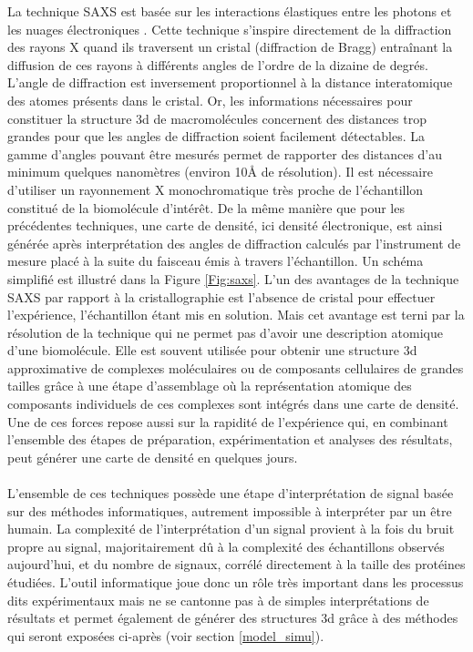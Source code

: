 La technique SAXS est basée sur les interactions élastiques entre les photons et les nuages électroniques \cite{guimer1955small}. Cette technique s'inspire directement de la diffraction des rayons X quand ils traversent un cristal (diffraction de Bragg) entraînant la diffusion de ces rayons à différents angles de l'ordre de la dizaine de degrés. L'angle de diffraction est inversement proportionnel à la distance interatomique des atomes présents dans le cristal. Or, les informations nécessaires pour constituer la structure 3d de macromolécules concernent des distances trop grandes pour que les angles de diffraction soient facilement détectables. La gamme d'angles pouvant être mesurés permet de rapporter des distances d'au minimum quelques nanomètres (environ 10\r{A} de résolution). Il est nécessaire d'utiliser un rayonnement X monochromatique très proche de l'échantillon constitué de la biomolécule d'intérêt. De la même manière que pour les précédentes techniques, une carte de densité, ici densité électronique, est ainsi générée après interprétation des angles de diffraction calculés par l'instrument de mesure placé à la suite du faisceau émis à travers l'échantillon. Un schéma simplifié est illustré dans la Figure \ref{Fig:saxs}.
L'un des avantages de la technique SAXS par rapport à la cristallographie est l'absence de cristal pour effectuer l'expérience, l'échantillon étant mis en solution. Mais cet avantage est terni par la résolution de la technique qui ne permet pas d'avoir une description atomique d'une biomolécule. Elle est souvent utilisée pour obtenir une structure 3d approximative de complexes moléculaires ou de composants cellulaires de grandes tailles grâce à une étape d'assemblage où la représentation atomique des composants individuels de ces complexes sont intégrés dans une carte de densité. Une de ces forces repose aussi sur la rapidité de l'expérience qui, en combinant l'ensemble des étapes de préparation, expérimentation et analyses des résultats, peut générer une carte de densité en quelques jours.
\\
\\
L'ensemble de ces techniques possède une étape d'interprétation de signal basée sur des méthodes informatiques, autrement impossible à interpréter par un être humain. La complexité de l'interprétation d'un signal provient à la fois du bruit propre au signal, majoritairement dû à la complexité des échantillons observés aujourd'hui, et du nombre de signaux, corrélé directement à la taille des protéines étudiées. L'outil informatique joue donc un rôle très important dans les processus dits expérimentaux mais ne se cantonne pas à de simples interprétations de résultats et permet également de générer des structures 3d grâce à des méthodes qui seront exposées ci-après (voir section \ref{model_simu}).

